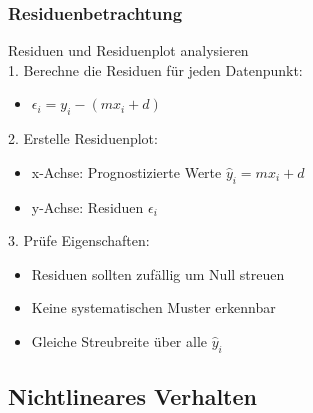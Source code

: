 \subsubsection{Residuenbetrachtung}

\begin{KR}{Residuen und Residuenplot analysieren}\\
1. Berechne die Residuen für jeden Datenpunkt:
   \begin{itemize}
     \item $\epsilon_i = y_i - (mx_i + d)$
   \end{itemize}
2. Erstelle Residuenplot:
   \begin{itemize}
     \item x-Achse: Prognostizierte Werte $\hat{y}_i = mx_i + d$
     \item y-Achse: Residuen $\epsilon_i$
   \end{itemize}
3. Prüfe Eigenschaften:
   \begin{itemize}
     \item Residuen sollten zufällig um Null streuen
     \item Keine systematischen Muster erkennbar
     \item Gleiche Streubreite über alle $\hat{y}_i$
   \end{itemize}
\end{KR}

\subsection{Nichtlineares Verhalten}


